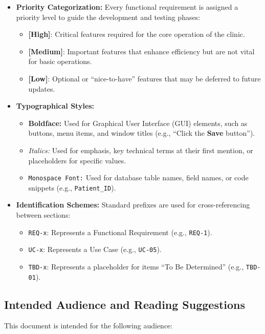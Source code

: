 \begin{itemize}
	\item \textbf{Priority Categorization:} Every functional requirement is assigned a priority level to guide the development and testing phases:
	\begin{itemize}
		\item \textbf{[High]}: Critical features required for the core operation of the clinic.
		\item \textbf{[Medium]}: Important features that enhance efficiency but are not vital for basic operations.
		\item \textbf{[Low]}: Optional or ``nice-to-have'' features that may be deferred to future updates.
	\end{itemize}
	
	\item \textbf{Typographical Styles:}
	\begin{itemize}
		\item \textbf{Boldface:} Used for Graphical User Interface (GUI) elements, such as buttons, menu items, and window titles (e.g., ``Click the \textbf{Save} button'').
		\item \textit{Italics:} Used for emphasis, key technical terms at their first mention, or placeholders for specific values.
		\item \texttt{Monospace Font:} Used for database table names, field names, or code snippets (e.g., \texttt{Patient\_ID}).
	\end{itemize}
	
	\item \textbf{Identification Schemes:} Standard prefixes are used for cross-referencing between sections:
	\begin{itemize}
		\item \texttt{REQ-x}: Represents a Functional Requirement (e.g., \texttt{REQ-1}).
		\item \texttt{UC-x}: Represents a Use Case (e.g., \texttt{UC-05}).
		\item \texttt{TBD-x}: Represents a placeholder for items ``To Be Determined'' (e.g., \texttt{TBD-01}).
	\end{itemize}
\end{itemize}

\subsection{Intended Audience and Reading Suggestions}

This document is intended for the following audience:

